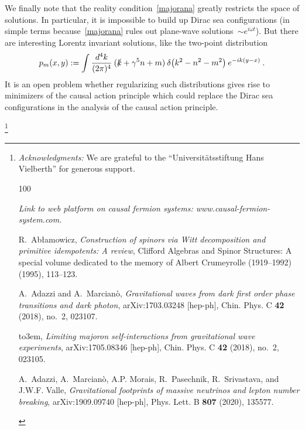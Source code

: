 \documentclass[reqno,11pt]{amsart}
\numberwithin{equation}{section}
\newcommand{\Thanks}{\vspace*{.5em} \noindent \thanks}
\newcommand{\1}{\mbox{\rm 1 \hspace{-1.05 em} 1}}
\begin{document}
We finally note that the reality condition~\eqref{majorana} greatly restricts the space of solutions.
In particular, it is impossible to build up Dirac sea configurations (in simple terms because~\eqref{majorana}
rules out plane-wave solutions~$\sim e^{i \omega t}$). But there are interesting
Lorentz invariant solutions, like the two-point distribution
\[ p_m(x,y) := \int \frac{d^4k}{(2 \pi)^4}\: (\slashed{k} + \gamma^5 n + m)\: \delta\big( k^2 - n^2-m^2 \big)\:
e^{-i k (y-x)} \:. \]
It is an open problem whether regularizing such distributions gives rise to minimizers of the causal action principle
which could replace the Dirac sea configurations in the analysis of the causal action principle.

\Thanks{{{\em{Acknowledgments:}} 
We are grateful to the ``Universit\"atsstiftung Hans Vielberth'' for generous support.}

%
%
%
\providecommand{\bysame}{\leavevmode\hbox to3em{\hrulefill}\thinspace}
\providecommand{\MR}{\relax\ifhmode\unskip\space\fi MR }
\providecommand{\MRhref}[2]{%
  \href{http://www.ams.org/mathscinet-getitem?mr=#1}{#2}
}
\providecommand{\href}[2]{#2}
\begin{thebibliography}{100}

\emph{Link to web platform on causal fermion systems:
  \href{https://www.causal-fermion-system.com}{\textrm{www.causal-fermion-system.com}}}.

R.~Ab{\l}amowicz, \emph{Construction of spinors via {W}itt decomposition and
  primitive idempotents: {A} review}, Clifford Algebras and Spinor Structures:
  A special volume dedicated to the memory of Albert Crumeyrolle (1919--1992)
  (1995), 113--123.

A.~Adazzi and A.~Marcian{\`o}, \emph{Gravitational waves from dark first order
  phase transitions and dark photon}, arXiv:1703.03248 [hep-ph], Chin. Phys. C
  \textbf{42} (2018), no.~2, 023107.

\bysame, \emph{Limiting majoron self-interactions from gravitational wave
  experiments}, arXiv:1705.08346 [hep-ph], Chin. Phys. C \textbf{42} (2018),
  no.~2, 023105.

A.~Adazzi, A.~Marcian{\`o}, A.P. Morais, R.~Pasechnik, R.~Srivastava, and
  J.W.F. Valle, \emph{Gravitational footprints of massive neutrinos and lepton
  number breaking}, arXiv:1909.09740 [hep-ph], Phys. Lett. B \textbf{807}
  (2020), 135577.


\end{thebibliography}}
\end{document}
